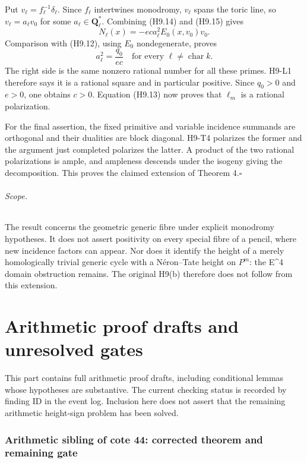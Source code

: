 \documentclass[11pt,a4paper]{article}
\begin{document}
Put $v_\ell=f_\ell^{-1}\delta_\ell$. Since $f_\ell$ intertwines
monodromy, $v_\ell$ spans the toric line, so
$v_\ell=a_\ell v_0$ for some $a_\ell\in\mathbf Q_\ell^*$.
Combining (H9.14) and (H9.15) gives
\[
 N_\ell(x)=-e c a_\ell^2 E_0(x,v_0)v_0.
\]
Comparison with (H9.12), using $E_0$ nondegenerate, proves
\[
 a_\ell^2=\frac{q_0}{e c}\quad\text{for every }\ell\ne
 \operatorname{char}k.                                \tag{H9.16}
\]
The right side is the same nonzero rational number for all these primes.
H9-L1 therefore says it is a rational square and in particular positive.
Since $q_0>0$ and $e>0$, one obtains $c>0$. Equation (H9.13) now proves
that $\ell_m$ is a rational polarization.

For the final assertion, the fixed primitive and variable incidence
summands are orthogonal and their dualities are block diagonal.
H9-T4 polarizes the former and the argument just completed polarizes
the latter. A product of the two rational polarizations is ample,
and ampleness descends under the isogeny giving the decomposition.
This proves the claimed extension of Theorem 4.\hfill$\square$

\paragraph{Scope.}
The result concerns the geometric generic fibre under explicit monodromy
hypotheses. It does not assert positivity on every special fibre of a
pencil, where new incidence factors can appear. Nor does it identify
the height of a merely homologically trivial generic cycle with a
N\'eron--Tate height on $P^m$: the E^4 domain obstruction remains.
The original H9(b) therefore does not follow from this extension.
\part{Arithmetic proof drafts and unresolved gates}
This part contains full arithmetic proof drafts, including conditional
lemmas whose hypotheses are substantive. The current checking status is
recorded by finding ID in the event log. Inclusion here does not assert
that the remaining arithmetic height-sign problem has been solved.
\section{Arithmetic sibling of cote 44: corrected theorem and remaining
gate}\label{arithmetic-sibling-of-cote-44-corrected-theorem-and-remaining-gate}
\end{document}
